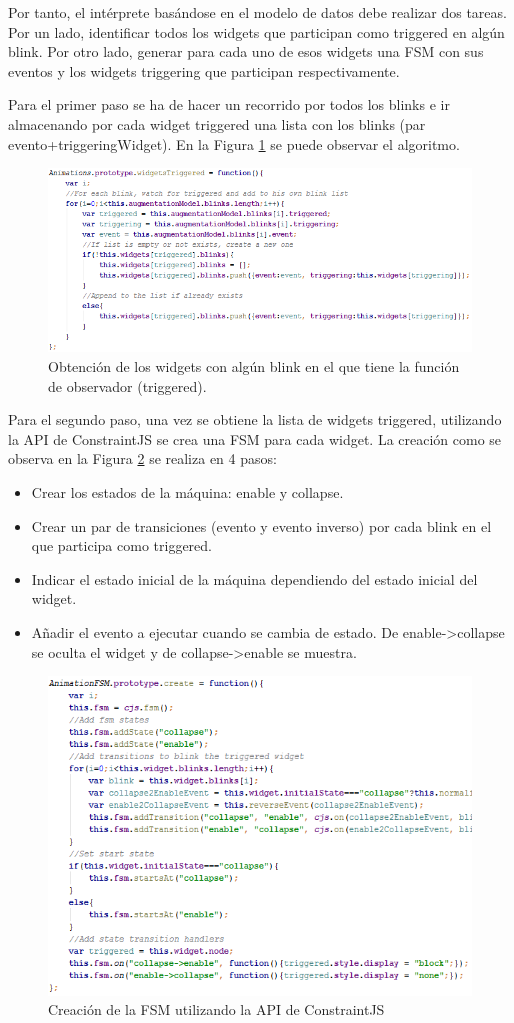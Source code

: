 Por tanto, el intérprete basándose en el modelo de datos debe realizar dos tareas. Por un lado, identificar todos los widgets que participan como triggered en algún blink. Por otro lado, generar para cada uno de esos widgets una FSM con sus eventos y los widgets triggering que participan respectivamente.

Para el primer paso se ha de hacer un recorrido por todos los blinks e ir almacenando por cada widget triggered una lista con los blinks (par evento+triggeringWidget). En la Figura \ref{fig:TriggeredWidgetsJavascript} se puede observar el algoritmo.

\begin{figure}
\centering
\includegraphics[width=0.7\linewidth]{./figs/5-TriggeredWidgetsJavascript}
\caption{Obtención de los widgets con algún blink en el que tiene la función de observador (triggered).}
\label{fig:TriggeredWidgetsJavascript}
\end{figure}

Para el segundo paso, una vez se obtiene la lista de widgets triggered, utilizando la API de ConstraintJS se crea una FSM para cada widget. La creación como se observa en la Figura \ref{fig:CJSFSMCreation} se realiza en 4 pasos:
\begin{itemize}
\item{Crear los estados de la máquina: enable y collapse.}
\item{Crear un par de transiciones (evento y evento inverso) por cada blink en el que participa como triggered.}
\item{Indicar el estado inicial de la máquina dependiendo del estado inicial del widget.}
\item{Añadir el evento a ejecutar cuando se cambia de estado. De enable->collapse se oculta el widget y de collapse->enable se muestra.}
\end{itemize}

\begin{figure}
\centering
\includegraphics[width=0.7\linewidth]{./figs/5-CJSFSMCreation}
\caption{Creación de la FSM utilizando la API de ConstraintJS}
\label{fig:CJSFSMCreation}
\end{figure}

